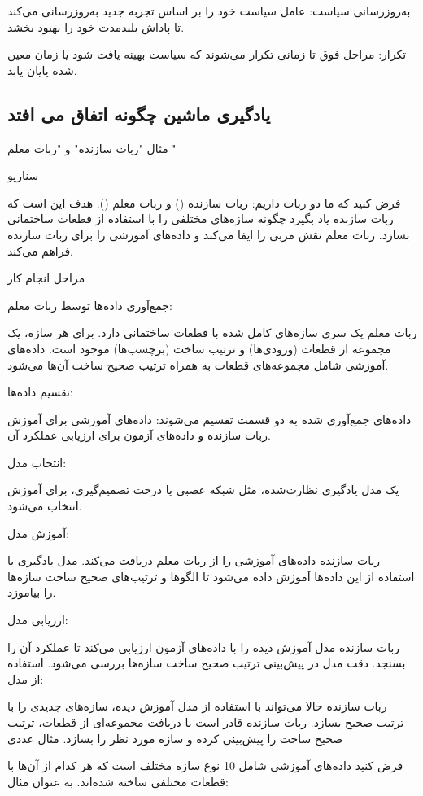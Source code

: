 \documentclass[a4paper, titlepage]{article}
\begin{document}
به‌روزرسانی سیاست: عامل سیاست خود را بر اساس تجربه جدید به‌روزرسانی می‌کند تا پاداش بلندمدت خود را بهبود بخشد.

تکرار: مراحل فوق تا زمانی تکرار می‌شوند که سیاست بهینه یافت شود یا زمان معین شده پایان یابد.

\subsection{یادگیری ماشین چگونه اتفاق می افتد}
مثال "ربات سازنده" و "ربات معلم
"

سناریو

فرض کنید که ما دو ربات داریم: ربات سازنده () و ربات معلم (). هدف این است که ربات سازنده یاد بگیرد چگونه سازه‌های مختلفی را با استفاده از قطعات ساختمانی بسازد. ربات معلم نقش مربی را ایفا می‌کند و داده‌های آموزشی را برای ربات سازنده فراهم می‌کند.

مراحل انجام کار

جمع‌آوری داده‌ها توسط ربات معلم:

ربات معلم یک سری سازه‌های کامل شده با قطعات ساختمانی دارد.
برای هر سازه، یک مجموعه از قطعات (ورودی‌ها) و ترتیب ساخت (برچسب‌ها) موجود است.
داده‌های آموزشی شامل مجموعه‌های قطعات به همراه ترتیب صحیح ساخت آن‌ها می‌شود.

تقسیم داده‌ها:

داده‌های جمع‌آوری شده به دو قسمت تقسیم می‌شوند: داده‌های آموزشی برای آموزش ربات سازنده و داده‌های آزمون برای ارزیابی عملکرد آن.

انتخاب مدل:

یک مدل یادگیری نظارت‌شده، مثل شبکه عصبی یا درخت تصمیم‌گیری، برای آموزش انتخاب می‌شود.

آموزش مدل:

ربات سازنده داده‌های آموزشی را از ربات معلم دریافت می‌کند.
مدل یادگیری با استفاده از این داده‌ها آموزش داده می‌شود تا الگوها و ترتیب‌های صحیح ساخت سازه‌ها را بیاموزد.

ارزیابی مدل:

ربات سازنده مدل آموزش دیده را با داده‌های آزمون ارزیابی می‌کند تا عملکرد آن را بسنجد.
دقت مدل در پیش‌بینی ترتیب صحیح ساخت سازه‌ها بررسی می‌شود.
استفاده از مدل:

ربات سازنده حالا می‌تواند با استفاده از مدل آموزش دیده، سازه‌های جدیدی را با ترتیب صحیح بسازد.
ربات سازنده قادر است با دریافت مجموعه‌ای از قطعات، ترتیب صحیح ساخت را پیش‌بینی کرده و سازه مورد نظر را بسازد.
مثال عددی

فرض کنید داده‌های آموزشی شامل 10 نوع سازه مختلف است که هر کدام از آن‌ها با قطعات مختلفی ساخته شده‌اند. به عنوان مثال:
\end{document}
